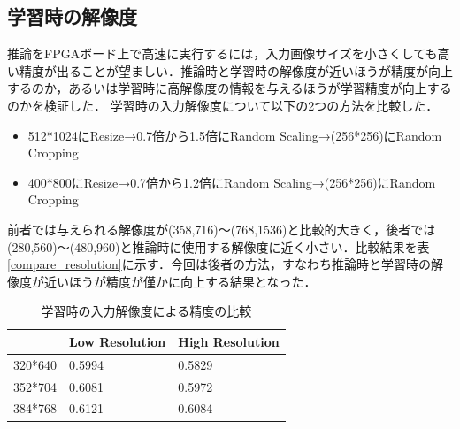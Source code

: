 \subsection{学習時の解像度}
推論をFPGAボード上で高速に実行するには，入力画像サイズを小さくしても高い精度が出ることが望ましい．推論時と学習時の解像度が近いほうが精度が向上するのか，あるいは学習時に高解像度の情報を与えるほうが学習精度が向上するのかを検証した．
学習時の入力解像度について以下の2つの方法を比較した．
\begin{itemize}
    \item{512*1024にResize→0.7倍から1.5倍にRandom Scaling→(256*256)にRandom Cropping}
    \item{400*800にResize→0.7倍から1.2倍にRandom Scaling→(256*256)にRandom Cropping}
\end{itemize}
前者では与えられる解像度が(358,716)〜(768,1536)と比較的大きく，後者では(280,560)〜(480,960)と推論時に使用する解像度に近く小さい．比較結果を表\ref{compare_resolution}に示す．今回は後者の方法，すなわち推論時と学習時の解像度が近いほうが精度が僅かに向上する結果となった．
\begin{table}[h]
    \caption{学習時の入力解像度による精度の比較} \vspace{1mm}
    \begin{center}
        \begin{tabular}{lll}
                & Low Resolution & High Resolution \\ \hline
        320*640 & 0.5994         & 0.5829            \\ \hline
        352*704 & 0.6081         & 0.5972               \\ \hline
        384*768 & 0.6121         & 0.6084
        \end{tabular}
    \end{center}
\end{table}
